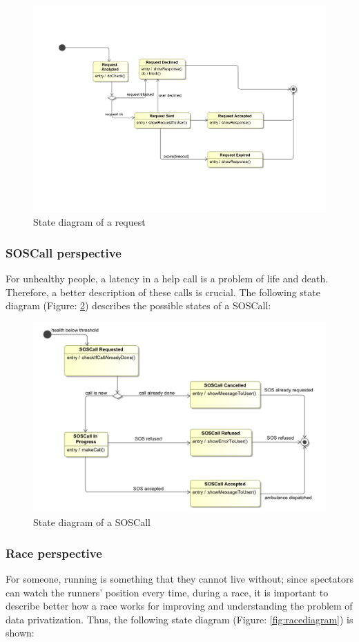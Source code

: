 \begin{figure}[H]
\includegraphics[width=0.8\linewidth]{Images/requestdiagram}
\caption{State diagram of a request}
\label{fig:requestdiagram}
\end{figure}

\subsubsection{SOSCall perspective}
For unhealthy people, a latency in a help call is a problem of life and death. Therefore, a better 
description of these calls is crucial. The following state diagram (Figure: \ref{fig:sosdiagram}) 
describes the possible states of a SOSCall:

\begin{figure}[H]
\includegraphics[width=0.8\linewidth]{Images/sosdiagram}
\caption{State diagram of a SOSCall}
\label{fig:sosdiagram}
\end{figure}

\subsubsection{Race perspective}
For someone, running is something that they cannot live without; since spectators can watch the runners' position every time, during a race, it is important to describe better how a race works for improving and understanding the problem of  data privatization. 
Thus, the following state diagram (Figure: \ref{fig:racediagram}) is shown: 

